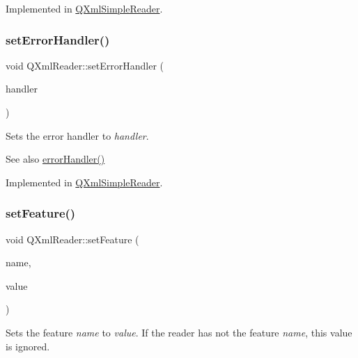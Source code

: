 Implemented in \mbox{\hyperlink{class_q_xml_simple_reader_a48dc90b8bdb4e1a0f8474079443f71b0}{Q\+Xml\+Simple\+Reader}}.

\mbox{\label{class_q_xml_reader_a97cab92522d1ceb8f6da94a161a72ee2}} 
\subsubsection{\texorpdfstring{setErrorHandler()}{setErrorHandler()}}
{\footnotesize\ttfamily void Q\+Xml\+Reader\+::set\+Error\+Handler (\begin{DoxyParamCaption}\item[{\mbox{\hyperlink{class_q_xml_error_handler}{Q\+Xml\+Error\+Handler}} $\ast$}]{handler }\end{DoxyParamCaption})\hspace{0.3cm}{\ttfamily [pure virtual]}}

Sets the error handler to {\itshape handler}.

\begin{DoxySeeAlso}{See also}
\mbox{\hyperlink{class_q_xml_reader_aa347587bcc9e8b109aed2c5a41687901}{error\+Handler()}} 
\end{DoxySeeAlso}


Implemented in \mbox{\hyperlink{class_q_xml_simple_reader_a2c660f128d0820723138e4e0af5b9dcb}{Q\+Xml\+Simple\+Reader}}.

\mbox{\label{class_q_xml_reader_a6673b0e33ef628df75410fabdafa3684}} 
\subsubsection{\texorpdfstring{setFeature()}{setFeature()}}
{\footnotesize\ttfamily void Q\+Xml\+Reader\+::set\+Feature (\begin{DoxyParamCaption}\item[{const \mbox{\hyperlink{class_q_string}{Q\+String}} \&}]{name,  }\item[{bool}]{value }\end{DoxyParamCaption})\hspace{0.3cm}{\ttfamily [pure virtual]}}

Sets the feature {\itshape name} to {\itshape value}. If the reader has not the feature {\itshape name}, this value is ignored.

